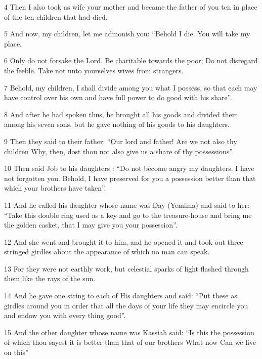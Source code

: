 \par 4 Then I also took as wife your mother and became the father of you ten in place of the ten children that had died.

\par 5 And now, my children, let me admonish you: “Behold I die. You will take my place.

\par 6 Only do not forsake the Lord. Be charitable towards the poor; Do not disregard the feeble. Take not unto yourselves wives from strangers.

\par 7 Behold, my children, I shall divide among you what I possess, so that each may have control over his own and have full power to do good with his share”.

\par 8 And after he had spoken thus, he brought all his goods and divided them among his seven sons, but he gave nothing of his goods to his daughters.

\par 9 Then they said to their father: “Our lord and father! Are we not also thy children Why, then, dost thou not also give us a share of thy possessions”

\par 10 Then said Job to his daughters : “Do not become angry my daughters. I have not forgotten you. Behold, I have preserved for you a possession better than that which your brothers have taken”.

\par 11 And he called his daughter whose name was Day (Yemima) and said to her: “Take this double ring used as a key and go to the treasure-house and bring me the golden casket, that I may give you your possession”.

\par 12 And she went and brought it to him, and he opened it and took out three-stringed girdles about the appearance of which no man can speak.

\par 13 For they were not earthly work, but celestial sparks of light flashed through them like the rays of the sun.

\par 14 And he gave one string to each of His daughters and said: “Put these as girdles around you in order that all the days of your life they may encircle you and endow you with every thing good”.

\par 15 And the other daughter whose name was Kassiah said: “Is this the possession of which thou sayest it is better than that of our brothers What now Can we live on this”

